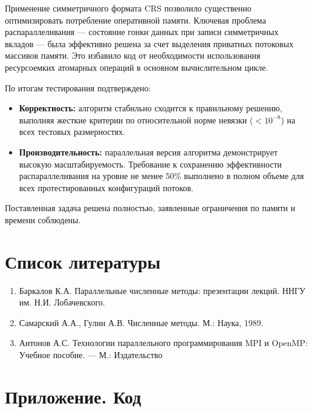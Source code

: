 \documentclass[12pt, a4paper]{article}
\begin{document}
Применение симметричного формата CRS позволило существенно оптимизировать потребление 
оперативной памяти. Ключевая проблема распараллеливания — состояние гонки данных
при записи симметричных вкладов — была эффективно решена за счет 
выделения приватных потоковых массивов памяти. Это избавило код от 
необходимости использования ресурсоемких атомарных операций в основном вычислительном цикле.

По итогам тестирования подтверждено:
\begin{itemize}
    \item \textbf{Корректность:} алгоритм стабильно сходится к правильному решению, выполняя жесткие 
    критерии по относительной норме невязки ($< 10^{-8}$) на всех тестовых размерностях.
    \item \textbf{Производительность:} параллельная версия алгоритма демонстрирует высокую масштабируемость. 
    Требование к сохранению эффективности распараллеливания на уровне не менее 50\% выполнено в 
    полном объеме для всех протестированных конфигураций потоков.
\end{itemize}

Поставленная задача решена полностью, заявленные ограничения по памяти и времени соблюдены.

\section{Список литературы}
\begin{enumerate}
    \item Баркалов К.А. Параллельные численные методы: презентации лекций. ННГУ им. Н.И. Лобачевского.
    \item Самарский А.А., Гулин А.В. Численные методы. М.: Наука, 1989.
    \item Антонов А.С. Технологии параллельного программирования MPI и OpenMP: Учебное пособие. — М.: Издательство
\end{enumerate}

\pagebreak

\appendix
\section{Приложение. Код}
\end{document}
